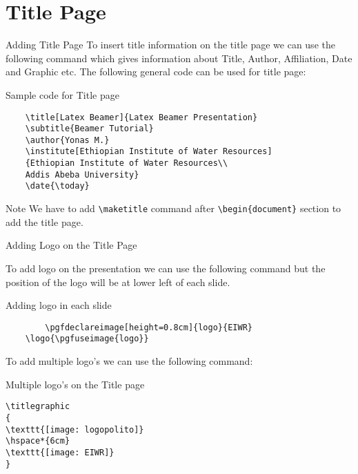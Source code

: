 \documentclass[10pt,xcolor=x11names]{beamer}
\begin{document}
\section{Title Page}
\begin{frame}[fragile]{Adding Title Page} 
To insert title information on the title page we can use the following command which gives information about Title, Author, Affiliation, Date and Graphic etc. The following general code can be used for title page:

{\footnotesize   \begin{exampleblock}{Sample code for Title page}
	\begin{verbatim}
	\title[Latex Beamer]{Latex Beamer Presentation}
	\subtitle{Beamer Tutorial}
	\author{Yonas M.}
	\institute[Ethiopian Institute of Water Resources]
	{Ethiopian Institute of Water Resources\\
	Addis Abeba University}
	\date{\today}
	\end{verbatim}\end{exampleblock}}
\begin{alertblock}{Note}
	We have to add \verb|\maketitle| command after \verb|\begin{document}| section to add the title page.
\end{alertblock}
\end{frame}

\begin{frame}[fragile]{Adding Logo on the Title Page}

To add logo on the presentation we can use the following command but the position of the logo will be at lower left of each slide. 
\begin{exampleblock}{Adding logo in each slide}
	\begin{verbatim}
		\pgfdeclareimage[height=0.8cm]{logo}{EIWR}
	\logo{\pgfuseimage{logo}}
	\end{verbatim}
\end{exampleblock}

To add multiple logo's we can use the following command:

{\footnotesize \begin{exampleblock}{Multiple logo's on the Title page}
\begin{verbatim}
\titlegraphic
{
\texttt{[image: logopolito]}
\hspace*{6cm}
\texttt{[image: EIWR]}
}	
\end{verbatim}
\end{exampleblock} }

\end{frame}
\end{document}
